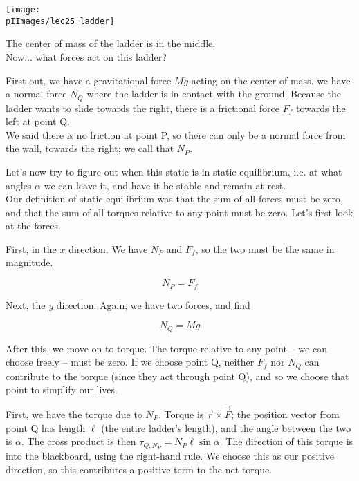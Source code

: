 \begin{center}
\texttt{[image: \\pIImages/lec25\_ladder]}
\end{center}

The center of mass of the ladder is in the middle.\\
Now... what forces act on this ladder?

First out, we have a gravitational force $M g$ acting on the center of mass.
 we have a normal force $N_Q$ where the ladder is in contact with the ground. Because the ladder wants to slide towards the right, there is a frictional force $F_f$ towards the left at point Q.\\
We said there is no friction at point P, so there can only be a normal force from the wall, towards the right; we call that $N_P$.

Let's now try to figure out when this static is in static equilibrium, i.e. at what angles $\alpha$ we can leave it, and have it be stable and remain at rest.\\
Our definition of static equilibrium was that the sum of all forces must be zero, and that the sum of all torques relative to any point must be zero. Let's first look at the forces.

First, in the $x$ direction. We have $N_P$ and $F_f$, so the two must be the same in magnitude.

\begin{equation}
N_P = F_f
\end{equation}

Next, the $y$ direction. Again, we have two forces, and find

\begin{equation}
N_Q = M g
\end{equation}

After this, we move on to torque. The torque relative to any point -- we can choose freely -- must be zero. If we choose point Q, neither $F_f$ nor $N_Q$ can contribute to the torque (since they act through point Q), and so we choose that point to simplify our lives.

First, we have the torque due to $N_P$. Torque is $\vec{r} \times \vec{F}$; the position vector from point Q has length $\ell$ (the entire ladder's length), and the angle between the two is $\alpha$. The cross product is then $\tau_{Q,N_P} = N_P \ell \sin \alpha$. The direction of this torque is into the blackboard, using the right-hand rule. We choose this as our positive direction, so this contributes a positive term to the net torque.

